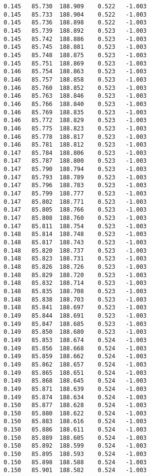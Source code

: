 \begin{verbatim}
   0.145   85.730  188.909    0.522   -1.003
   0.145   85.733  188.904    0.522   -1.003
   0.145   85.736  188.898    0.522   -1.003
   0.145   85.739  188.892    0.523   -1.003
   0.145   85.742  188.886    0.523   -1.003
   0.145   85.745  188.881    0.523   -1.003
   0.145   85.748  188.875    0.523   -1.003
   0.145   85.751  188.869    0.523   -1.003
   0.146   85.754  188.863    0.523   -1.003
   0.146   85.757  188.858    0.523   -1.003
   0.146   85.760  188.852    0.523   -1.003
   0.146   85.763  188.846    0.523   -1.003
   0.146   85.766  188.840    0.523   -1.003
   0.146   85.769  188.835    0.523   -1.003
   0.146   85.772  188.829    0.523   -1.003
   0.146   85.775  188.823    0.523   -1.003
   0.146   85.778  188.817    0.523   -1.003
   0.146   85.781  188.812    0.523   -1.003
   0.147   85.784  188.806    0.523   -1.003
   0.147   85.787  188.800    0.523   -1.003
   0.147   85.790  188.794    0.523   -1.003
   0.147   85.793  188.789    0.523   -1.003
   0.147   85.796  188.783    0.523   -1.003
   0.147   85.799  188.777    0.523   -1.003
   0.147   85.802  188.771    0.523   -1.003
   0.147   85.805  188.766    0.523   -1.003
   0.147   85.808  188.760    0.523   -1.003
   0.147   85.811  188.754    0.523   -1.003
   0.148   85.814  188.748    0.523   -1.003
   0.148   85.817  188.743    0.523   -1.003
   0.148   85.820  188.737    0.523   -1.003
   0.148   85.823  188.731    0.523   -1.003
   0.148   85.826  188.726    0.523   -1.003
   0.148   85.829  188.720    0.523   -1.003
   0.148   85.832  188.714    0.523   -1.003
   0.148   85.835  188.708    0.523   -1.003
   0.148   85.838  188.703    0.523   -1.003
   0.148   85.841  188.697    0.523   -1.003
   0.149   85.844  188.691    0.523   -1.003
   0.149   85.847  188.685    0.523   -1.003
   0.149   85.850  188.680    0.523   -1.003
   0.149   85.853  188.674    0.524   -1.003
   0.149   85.856  188.668    0.524   -1.003
   0.149   85.859  188.662    0.524   -1.003
   0.149   85.862  188.657    0.524   -1.003
   0.149   85.865  188.651    0.524   -1.003
   0.149   85.868  188.645    0.524   -1.003
   0.149   85.871  188.639    0.524   -1.003
   0.149   85.874  188.634    0.524   -1.003
   0.150   85.877  188.628    0.524   -1.003
   0.150   85.880  188.622    0.524   -1.003
   0.150   85.883  188.616    0.524   -1.003
   0.150   85.886  188.611    0.524   -1.003
   0.150   85.889  188.605    0.524   -1.003
   0.150   85.892  188.599    0.524   -1.003
   0.150   85.895  188.593    0.524   -1.003
   0.150   85.898  188.588    0.524   -1.003
   0.150   85.901  188.582    0.524   -1.003

\end{verbatim}
